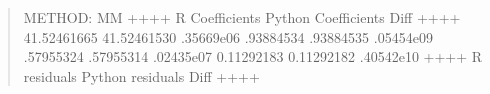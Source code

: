 \documentclass[letterpaper,10pt,english]{sphinxmanual}
\begin{document}
\begin{enumerate}
\begin{quote}
\begin{sphinxVerbatim}[commandchars=\\\{\}]
METHOD: MM
+\PYGZhy{}\PYGZhy{}\PYGZhy{}\PYGZhy{}\PYGZhy{}\PYGZhy{}\PYGZhy{}\PYGZhy{}\PYGZhy{}\PYGZhy{}\PYGZhy{}\PYGZhy{}\PYGZhy{}\PYGZhy{}\PYGZhy{}\PYGZhy{}+\PYGZhy{}\PYGZhy{}\PYGZhy{}\PYGZhy{}\PYGZhy{}\PYGZhy{}\PYGZhy{}\PYGZhy{}\PYGZhy{}\PYGZhy{}\PYGZhy{}\PYGZhy{}\PYGZhy{}\PYGZhy{}\PYGZhy{}\PYGZhy{}\PYGZhy{}\PYGZhy{}\PYGZhy{}\PYGZhy{}\PYGZhy{}+\PYGZhy{}\PYGZhy{}\PYGZhy{}\PYGZhy{}\PYGZhy{}\PYGZhy{}\PYGZhy{}\PYGZhy{}\PYGZhy{}\PYGZhy{}\PYGZhy{}\PYGZhy{}\PYGZhy{}+
 R Coefficients  Python Coefficients     Diff     
+\PYGZhy{}\PYGZhy{}\PYGZhy{}\PYGZhy{}\PYGZhy{}\PYGZhy{}\PYGZhy{}\PYGZhy{}\PYGZhy{}\PYGZhy{}\PYGZhy{}\PYGZhy{}\PYGZhy{}\PYGZhy{}\PYGZhy{}\PYGZhy{}+\PYGZhy{}\PYGZhy{}\PYGZhy{}\PYGZhy{}\PYGZhy{}\PYGZhy{}\PYGZhy{}\PYGZhy{}\PYGZhy{}\PYGZhy{}\PYGZhy{}\PYGZhy{}\PYGZhy{}\PYGZhy{}\PYGZhy{}\PYGZhy{}\PYGZhy{}\PYGZhy{}\PYGZhy{}\PYGZhy{}\PYGZhy{}+\PYGZhy{}\PYGZhy{}\PYGZhy{}\PYGZhy{}\PYGZhy{}\PYGZhy{}\PYGZhy{}\PYGZhy{}\PYGZhy{}\PYGZhy{}\PYGZhy{}\PYGZhy{}\PYGZhy{}+
   \PYGZhy{}41.52461665         \PYGZhy{}41.52461530  .35669e\PYGZhy{}06 
     .93884534           .93884535  .05454e\PYGZhy{}09 
     .57955324           .57955314  .02435e\PYGZhy{}07 
    \PYGZhy{}0.11292183          \PYGZhy{}0.11292182  .40542e\PYGZhy{}10 
+\PYGZhy{}\PYGZhy{}\PYGZhy{}\PYGZhy{}\PYGZhy{}\PYGZhy{}\PYGZhy{}\PYGZhy{}\PYGZhy{}\PYGZhy{}\PYGZhy{}\PYGZhy{}\PYGZhy{}\PYGZhy{}\PYGZhy{}\PYGZhy{}+\PYGZhy{}\PYGZhy{}\PYGZhy{}\PYGZhy{}\PYGZhy{}\PYGZhy{}\PYGZhy{}\PYGZhy{}\PYGZhy{}\PYGZhy{}\PYGZhy{}\PYGZhy{}\PYGZhy{}\PYGZhy{}\PYGZhy{}\PYGZhy{}\PYGZhy{}\PYGZhy{}\PYGZhy{}\PYGZhy{}\PYGZhy{}+\PYGZhy{}\PYGZhy{}\PYGZhy{}\PYGZhy{}\PYGZhy{}\PYGZhy{}\PYGZhy{}\PYGZhy{}\PYGZhy{}\PYGZhy{}\PYGZhy{}\PYGZhy{}\PYGZhy{}+
  R residuals     Python residuals       Diff     
+\PYGZhy{}\PYGZhy{}\PYGZhy{}\PYGZhy{}\PYGZhy{}\PYGZhy{}\PYGZhy{}\PYGZhy{}\PYGZhy{}\PYGZhy{}\PYGZhy{}\PYGZhy{}\PYGZhy{}\PYGZhy{}\PYGZhy{}\PYGZhy{}+\PYGZhy{}\PYGZhy{}\PYGZhy{}\PYGZhy{}\PYGZhy{}\PYGZhy{}\PYGZhy{}\PYGZhy{}\PYGZhy{}\PYGZhy{}\PYGZhy{}\PYGZhy{}\PYGZhy{}\PYGZhy{}\PYGZhy{}\PYGZhy{}\PYGZhy{}\PYGZhy{}\PYGZhy{}\PYGZhy{}\PYGZhy{}+\PYGZhy{}\PYGZhy{}\PYGZhy{}\PYGZhy{}\PYGZhy{}\PYGZhy{}\PYGZhy{}\PYGZhy{}\PYGZhy{}\PYGZhy{}\PYGZhy{}\PYGZhy{}\PYGZhy{}+

\end{sphinxVerbatim}
\end{quote}
\end{enumerate}
\end{document}
